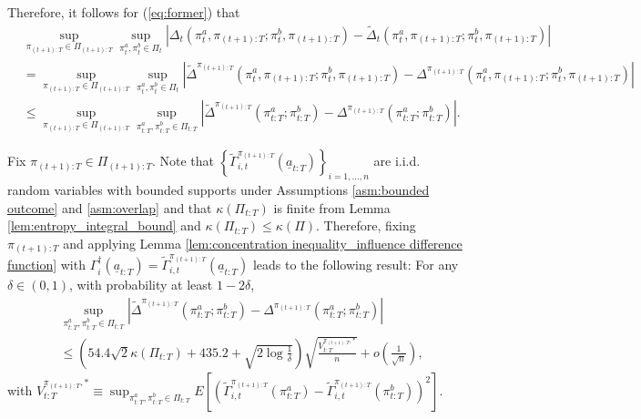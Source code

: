 Therefore, it follows for (\ref{eq:former}) that 
\begin{align}
   & \sup_{\pi_{(t+1):T} \in \Pi_{(t+1):T}}\sup_{\pi_{t}^{a},\pi_{t}^{b} \in \Pi_{t}} |\Delta_{t}(\pi_{t}^{a},\pi_{(t+1):T};\pi_{t}^{b},\pi_{(t+1):T}) - \widetilde{\Delta}_{t}(\pi_{t}^{a},\pi_{(t+1):T};\pi_{t}^{b},\pi_{(t+1):T})| \nonumber \\
  &=\sup_{\pi_{(t+1):T} \in \Pi_{(t+1):T}}\sup_{\pi_{t}^{a},\pi_{t}^{b} \in \Pi_{t}} |\widetilde{\Delta}^{\pi_{(t+1):T}}(\pi_{t}^{a},\pi_{(t+1):T};\pi_{t}^{b},\pi_{(t+1):T})  - \Delta^{\pi_{(t+1):T}}(\pi_{t}^{a},\pi_{(t+1):T};\pi_{t}^{b},\pi_{(t+1):T}) | \nonumber \\
  &\leq \sup_{\pi_{(t+1):T} \in \Pi_{(t+1):T}} 
  \sup_{\pi_{t:T}^{a},\pi_{t:T}^{b} \in \Pi_{t:T}} 
  |\widetilde{\Delta}^{\pi_{(t+1):T}}(\pi_{t:T}^{a};\pi_{t:T}^{b})  - \Delta^{\pi_{(t+1):T}}(\pi_{t:T}^{a};\pi_{t:T}^{b})|. \label{eq:tilde_delta_inequalty}
\end{align}

Fix $\pi_{(t+1):T} \in \Pi_{(t+1):T}$. Note that $\left\{\widetilde{\Gamma}_{i,t}^{\pi_{(t+1):T}}(\underline{a}_{t:T})\right\}_{i=1,\ldots,n}$ are i.i.d. random variables  with bounded supports under Assumptions \ref{asm:bounded outcome} and \ref{asm:overlap} and that $\kappa(\Pi_{t:T})$ is finite from Lemma \ref{lem:entropy_integral_bound} and $\kappa(\Pi_{t:T}) \leq \kappa(\Pi)$. 
Therefore, fixing $\pi_{(t+1):T}$ and applying Lemma \ref{lem:concentration inequality_influence difference function} with $\Gamma_{i}^{\dag}(\underline{a}_{t:T})=\widetilde{\Gamma}_{i,t}^{\pi_{(t+1):T}}(\underline{a}_{t:T})$ leads to the following result:
For any $\delta \in (0,1)$, with probability at least $1-2\delta$,
\begin{align}
    &\sup_{\pi_{t:T}^{a},\pi_{t:T}^{b} \in \Pi_{t:T}} 
  |\widetilde{\Delta}^{\pi_{(t+1):T}}(\pi_{t:T}^{a};\pi_{t:T}^{b})  - \Delta^{\pi_{(t+1):T}}(\pi_{t:T}^{a};\pi_{t:T}^{b})| \nonumber\\
    &\leq \left(54.4 \sqrt{2}\kappa(\Pi_{t:T}) + 435.2 + \sqrt{2 \log \frac{1}{\delta}}\right)\sqrt{\frac{V_{t:T}^{\pi_{(t+1):T},\ast}}{n}} + o\left(\frac{1}{\sqrt{n}}\right), \label{eq:bound_influence_difference_function_2}
\end{align}
with $V_{t:T}^{\pi_{(t+1):T},\ast}  \equiv  \sup_{\pi_{t:T}^{a},\pi_{t:T}^{b} \in \Pi_{t:T}}E
    \left[\left(\widetilde{\Gamma}_{i,t}^{\pi_{(t+1):T}}(\pi_{t:T}^{a}) - \widetilde{\Gamma}_{i,t}^{\pi_{(t+1):T}}(\pi_{t:T}^{b}) \right)^2\right]$.
    

